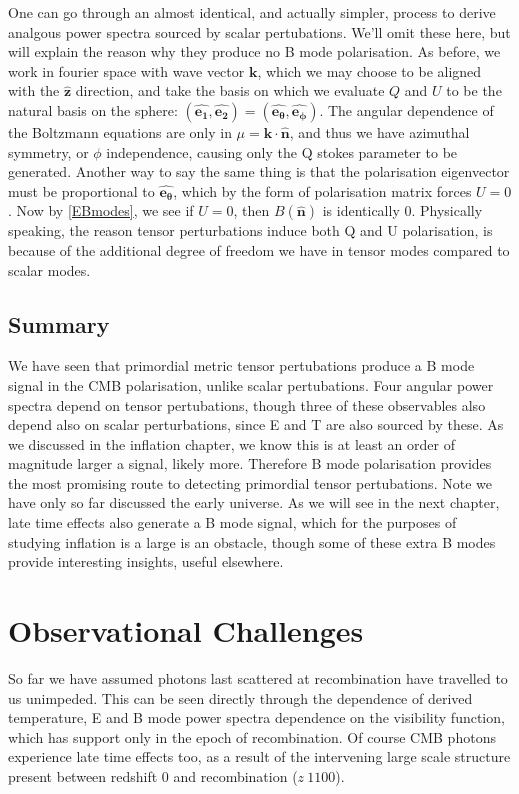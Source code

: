\documentclass[a4paper,11pt]{article}
\renewcommand{\v}[1]{\mathbf{#1}}
\newcommand{\unit}[1]{\hat{\v{#1}}}
\begin{document}
One can go through an almost identical, and actually simpler, process to derive analgous power spectra sourced by scalar pertubations. We'll omit these here, but will explain the reason why they produce no B mode polarisation. As before, we work in fourier space with wave vector $\v{k}$, which we may choose to be aligned with the $\unit{z}$ direction, and take the basis on which we evaluate $Q$ and $U$ to be the natural basis on the sphere: $(\unit{e_1}, \unit{e_2}) = (\unit{e_\theta}, \unit{e_\phi})$. The angular dependence of the Boltzmann equations are only in $\mu=\v{k}\cdot\unit{n}$, and thus we have azimuthal symmetry, or $\phi$ independence, causing only the Q stokes parameter to be generated. Another way to say the same thing is that the polarisation eigenvector must be proportional to $\unit{e_\theta}$, which by the form of polarisation matrix forces $U=0$. Now by \ref{EBmodes}, we see if $U=0$, then $B(\unit{n})$ is identically 0. Physically speaking, the reason tensor perturbations induce both Q and U polarisation, is because of the additional degree of freedom we have in tensor modes compared to scalar modes.


\subsection{Summary}

We have seen that primordial metric tensor pertubations produce a B mode signal in the CMB polarisation, unlike scalar pertubations. Four angular power spectra depend on tensor pertubations, though three of these observables also depend also on scalar perturbations, since E and T are also sourced by  these. As we discussed in the inflation chapter, we know this is at least an order of magnitude larger a signal, likely more. Therefore B mode polarisation provides the most promising route to detecting primordial tensor pertubations. Note we have only so far discussed the early universe. As we will see in the next chapter, late time effects also generate a B mode signal, which for the purposes of studying inflation is a large is an obstacle, though some of these extra B modes provide interesting insights, useful elsewhere.






\section{Observational Challenges}


So far we have assumed photons last scattered at recombination have travelled to us unimpeded. This can be seen directly through the dependence of derived temperature, E and B mode  power spectra dependence on the visibility function, which has support only in the epoch of recombination. Of course CMB photons experience late time effects too, as a result of the intervening large scale structure present between redshift 0 and recombination ($z ~ 1100$). 
\end{document}
